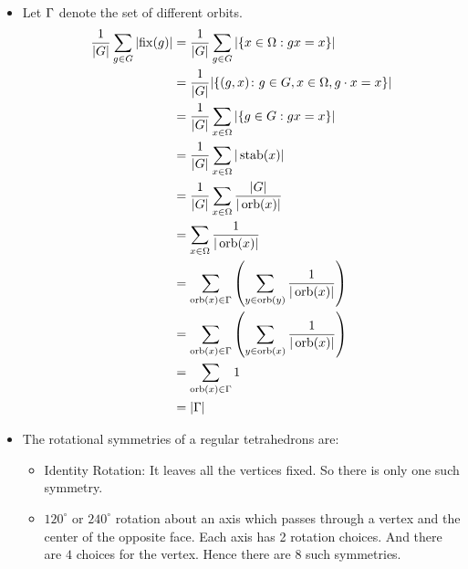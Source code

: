 \documentclass[a4paper, 11pt]{article}
\begin{document}
{\begin{itemize}
	\item Let $\Gamma$ denote the set of different orbits. \begin{align*}
		\frac{1}{|G|} \sum_{g \in G}\left|\operatorname{fix}(g)\right| & =\frac{1}{|G|} \sum_{g \in G}|\{x \in \Omega: g x=x\}|                                                                        \\
		& =\frac1{|G|} |\{(g,x)\colon g\in G, x\in \Omega, g\cdot x=x\}|\\
		                                             & =\frac{1}{|G|} \sum_{x \in \Omega}|\{g \in G: g x=x\}|                                                                        \\
		                                             & =\frac{1}{|G|} \sum_{x \in \Omega}|\operatorname{stab}(x)|                                                                    \\
		                                             & =\frac{1}{|G|} \sum_{x \in \Omega} \frac{|G|}{|\operatorname{orb}(x)|}                                                        \\
		                                             & =\sum_{x \in \Omega} \frac{1}{|\operatorname{orb}(x)|}                                                                        \\
		                                             & =\sum_{\operatorname{orb}(x) \in \Gamma}\left(\sum_{y \in \operatorname{orb}(y)} \frac{1}{|\operatorname{orb}(x)|}\right) \\
		                                             & =\sum_{\operatorname{orb}(x) \in \Gamma}\left(\sum_{y \in \operatorname{orb}(x)} \frac{1}{|\operatorname{orb}(x)|}\right) \\
		                                             & =\sum_{\operatorname{orb}(x) \in \Gamma} 1                                                                                \\
		                                             & =|\Gamma|
	\end{align*} 
\item The rotational symmetries of a regular tetrahedrons are:
\begin{itemize}
	\item Identity Rotation: It leaves all the vertices fixed. So there is only one such symmetry.
	\item $120^{\circ}$ or $240^{\circ}$ rotation about an axis which passes through a vertex and the center of the opposite face. Each axis has 2 rotation choices. And there are $4$ choices for the vertex. Hence there are $8$ such symmetries.

\end{itemize}
\end{itemize}}
\end{document}
